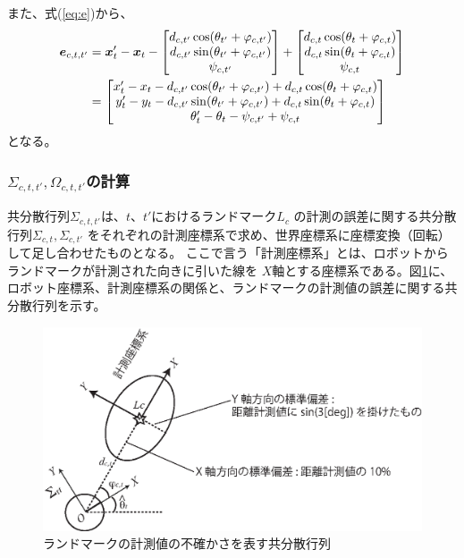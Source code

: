 また、式(\ref{eq:e})から、
\begin{align}
	\boldsymbol{e}_{c,t,t'} &= \boldsymbol{x}_t' - \boldsymbol{x}_t -
	\begin{bmatrix}
	d_{c,t'} \cos(\theta_{t'} + \varphi_{c,t'}) \\
	d_{c,t'} \sin(\theta_{t'} + \varphi_{c,t'}) \\
	\psi_{c,t'}
	\end{bmatrix}
	+ 
	\begin{bmatrix}
	d_{c,t} \cos(\theta_t + \varphi_{c,t}) \\
	d_{c,t} \sin(\theta_t + \varphi_{c,t}) \\
	\psi_{c,t}
	\end{bmatrix} \nonumber \\
	&= 
	\begin{bmatrix}
		x_t' - x_t 
		- d_{c,t'} \cos(\theta_{t'} + \varphi_{c,t'}) + d_{c,t} \cos(\theta_t + \varphi_{c,t}) \\
		y_t' - y_t 
	- d_{c,t'} \sin(\theta_{t'} + \varphi_{c,t'}) + d_{c,t} \sin(\theta_t + \varphi_{c,t}) \\
		\theta_t' - \theta_t 
	- \psi_{c,t'} + \psi_{c,t}
	\end{bmatrix} \label{eq:e2}
\end{align}
となる。

\subsubsection{$\Sigma_{c,t,t'}, \Omega_{c,t,t'}$の計算}

共分散行列$\Sigma_{c,t,t'}$は、$t$、$t'$におけるランドマーク$L_c$
の計測の誤差に関する共分散行列$\Sigma_{c,t}, \Sigma_{c,t'}$
をそれぞれの計測座標系で求め、世界座標系に座標変換（回転）して足し合わせたものとなる。
ここで言う「計測座標系」とは、ロボットからランドマークが計測された向きに引いた線を
$X$軸とする座標系である。図\ref{fig:observation_noise}に、
ロボット座標系、計測座標系の関係と、ランドマークの計測値の誤差に関する共分散行列を示す。

\begin{figure}[htbp]
	\begin{center}
		\includegraphics[width=0.8\linewidth]{./figs/observation_noise.eps}
		\caption{ランドマークの計測値の不確かさを表す共分散行列}
		\label{fig:observation_noise}
	\end{center}
\end{figure}


